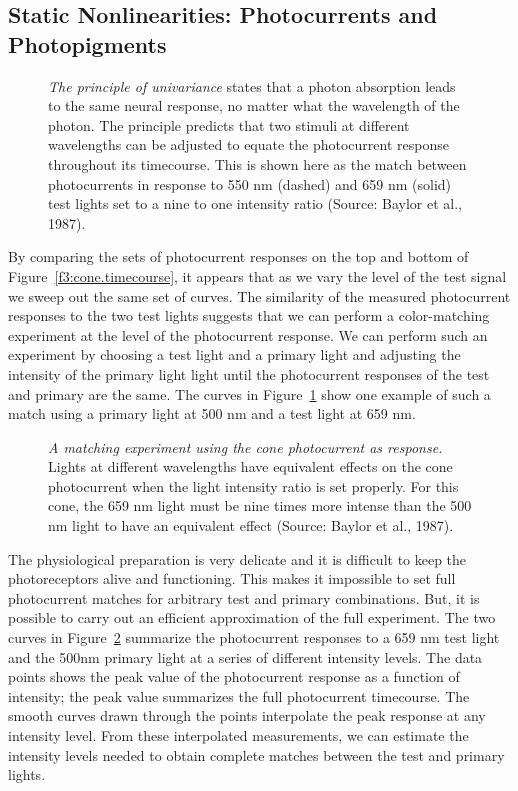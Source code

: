 \subsection*{Static Nonlinearities:  Photocurrents and Photopigments}
\begin{figure}
\centerline {
}
\caption[Univariance of Photocurrent]{
{\em The principle of univariance} states that
a photon absorption leads to the same neural response,
no matter what the wavelength of the photon.
The principle predicts that two stimuli at different wavelengths
can be adjusted to equate
the photocurrent response throughout its timecourse.
This is shown here as the
match between photocurrents in response to
550 nm (dashed) and 659 nm (solid)
test lights set to a nine to one intensity ratio (Source: Baylor et al., 1987).
}
\label{f3:univariance}
\end{figure}
By comparing the sets of photocurrent responses on the top
and bottom of Figure~\ref{f3:cone.timecourse}, 
it appears that as we vary the
level of the test signal we sweep out the same set of curves.
The similarity of the measured photocurrent responses to
the two test lights suggests that we can perform a color-matching
experiment at the level of the photocurrent response.
We can perform such an experiment by choosing a test
light and a primary light
and adjusting the intensity of the primary
light light until the
photocurrent responses of the test and primary are the same.
The curves in Figure~\ref{f3:univariance}
show one example of such a match
using a primary light at 500 nm and a test light at 659 nm.

\begin{figure}
\centerline {
}
\caption[Homogeneity of Photocurrent]{
{\em A matching experiment using the cone photocurrent as response.}
Lights at different wavelengths have equivalent effects
on the cone photocurrent when the light
intensity ratio is set properly.
For this cone,
the 659 nm light must
be nine times more intense than the 500 nm light
to have an equivalent effect (Source: Baylor et al., 1987).
}
\label{f3:phot.homogeneity}
\end{figure}
The physiological preparation is very delicate and
it is difficult to keep the photoreceptors alive and functioning.
This makes it
impossible to set full photocurrent matches
for arbitrary test and primary combinations.
But, it is possible to carry out
an efficient approximation of the full experiment.
The two curves in Figure~\ref{f3:phot.homogeneity}
summarize the photocurrent responses to a
659 nm test light and the 500nm primary light
at a series of different intensity levels.
The data points shows the peak value of the photocurrent response
as a function of intensity;
the peak value summarizes the full photocurrent timecourse.
The smooth curves drawn through the
points interpolate the peak response at any
intensity level.
From these interpolated measurements,
we can estimate the intensity levels needed to
obtain complete matches
between the test and primary lights.

